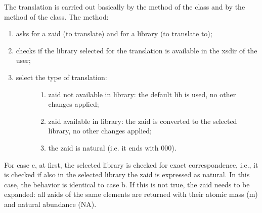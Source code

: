 \documentclass[letterpaper,10pt,english]{sphinxmanual}
\begin{document}
The translation is carried out basically by the  method of the
 class and by the  method of the  class.
The  method:
\begin{enumerate}
%
\item {} 
asks for a zaid (to translate) and for a library (to translate to);

\item {} 
checks if the library selected for the translation is available in the xsdir of
the user;

\item {} \begin{description}
\item[{select the type of translation:}] \leavevmode\begin{enumerate}
%
\item {} 
zaid not available in library: the default lib is used, no other changes
applied;

\item {} 
zaid available in library: the zaid is converted to the selected library,
no other changes applied;

\item {} 
the zaid is natural (i.e. it ends with 000).

\end{enumerate}

\end{description}

\end{enumerate}

For case c, at first, the selected library is checked for exact correspondence,
i.e., it is checked if also in the selected library the zaid is expressed as natural.
In this case, the behavior is identical to case b. If this is not true, the zaid needs
to be expanded: all zaids of the same elements are returned with their atomic mass (m)
and natural abundance (NA).
\end{document}
